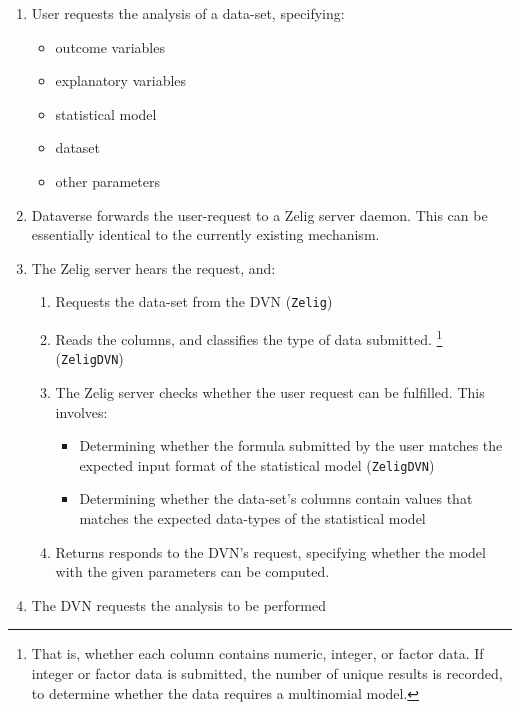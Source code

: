 \documentclass{article}
\begin{document}
\begin{enumerate}
  \item User requests the analysis of a data-set, specifying:
    \begin{itemize}
      \item outcome variables
      \item explanatory variables
      \item statistical model
      \item dataset
      \item other parameters
    \end{itemize}

  \item Dataverse forwards the user-request to a Zelig server daemon. This can
    be essentially identical to the currently existing mechanism.

  \item The Zelig server hears the request, and:
    \begin{enumerate}
      \item Requests the data-set from the DVN ({\tt Zelig})
      \item Reads the columns, and classifies the type of data submitted.
        \footnote{That is, whether each column contains numeric, integer, or
          factor data. If integer or factor data is submitted, the number of
          unique results is recorded, to determine whether the data requires a
          multinomial model.
        } ({\tt ZeligDVN})
      \item The Zelig server checks whether the user request can be fulfilled.
        This involves:
        \begin{itemize}
          \item Determining whether the formula submitted by the user matches 
            the expected input format of the statistical model ({\tt ZeligDVN})
          \item Determining whether the data-set's columns contain values that
            matches the expected data-types of the statistical model
        \end{itemize}
      \item Returns responds to the DVN's request, specifying whether the model
        with the given parameters can be computed.
    \end{enumerate}
    
  \item The DVN requests the analysis to be performed


\end{enumerate}
\end{document}
